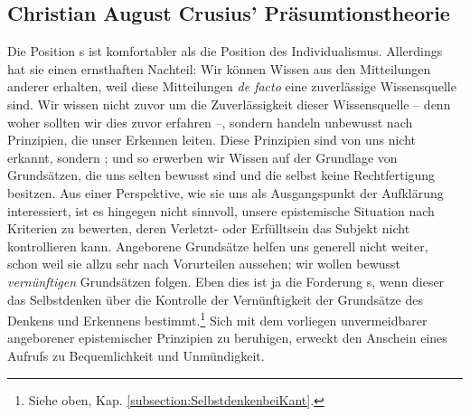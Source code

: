 \subsection{Christian August Crusius' Präsumtionstheorie}
\label{subsubsection:ChristianAugustCrusius}
Die Position s ist
komfortabler als die Position des Individualismus. Allerdings hat sie einen
ernsthaften Nachteil: Wir können Wissen
aus den Mitteilungen anderer erhalten, weil diese Mitteilungen \emph{de facto}
eine zuverlässige Wissensquelle sind. Wir wissen nicht zuvor um die
Zuverlässigkeit dieser Wissensquelle -- denn woher sollten wir dies zuvor
erfahren --, sondern handeln unbewusst nach Prinzipien, die unser Erkennen
leiten. Diese Prinzipien sind von uns nicht erkannt, sondern
; und so erwerben wir Wissen auf der Grundlage von
Grundsätzen, die uns selten bewusst sind und die selbst keine Rechtfertigung
besitzen. Aus einer Perspektive, wie sie uns als Ausgangspunkt der
Aufklärung interessiert, ist es hingegen nicht
sinnvoll, unsere epistemische Situation nach Kriterien zu bewerten, deren
Verletzt- oder Erfülltsein das Subjekt nicht kontrollieren kann. Angeborene
Grundsätze helfen uns generell nicht weiter, schon weil sie allzu sehr nach
Vorurteilen aussehen; wir wollen bewusst \emph{vernünftigen} Grundsätzen folgen.
Eben dies ist ja die Forderung s, wenn dieser das
Selbstdenken über die Kontrolle der Vernünftigkeit der Grundsätze des Denkens
und Erkennens bestimmt.\footnote{Siehe oben, Kap.
\ref{subsection:SelbstdenkenbeiKant}.} Sich mit dem vorliegen unvermeidbarer
angeborener epistemischer Prinzipien zu beruhigen, erweckt den Anschein eines
Aufrufs zu Bequemlichkeit und Unmündigkeit.

